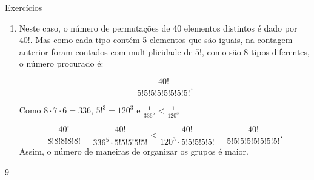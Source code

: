 \begin{answer}{Exercícios}
{\begin{enumerate}
\item Neste caso, o número de permutações de 40 elementos distintos é dado por $40!$. Mas como cada tipo contém 5 elementos que são iguais, na contagem anterior foram contados com multiplicidade de $5!$, como são 8 tipos diferentes, o número procurado é:

$$\dfrac{40!}{5!5!5!5!5!5!5!5!}.$$

Como $8\cdot 7 \cdot 6 = 336$, $5!^3=120^3$ e  $\frac{1}{336^5}< \frac{1}{ 120^3} $  

$$\dfrac{40!}{8!8!8!8!8!} = \dfrac{40!}{336^5 \cdot 5!5!5!5!5!} <  \dfrac{40!}{120^3 \cdot 5!5!5!5!5!}= \dfrac{40!}{5!5!5!5!5!5!5!5!}.$$ Assim, o número de maneiras de organizar os grupos é maior.
\end{enumerate}
}{9}
\end{answer}

